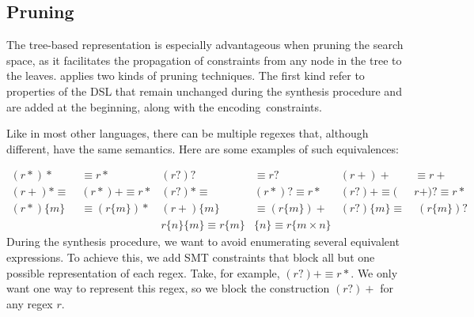 \subsection{Pruning}\label{sec:pruning}
The tree-based representation is especially advantageous when pruning the search space, as it facilitates the propagation of constraints from any node in the tree to the leaves.
\Forest{} applies two kinds of pruning techniques. The first kind refer to properties of the DSL that remain unchanged during the synthesis procedure and are added at the beginning, along with the encoding~constraints. %

Like in most other languages, there can be multiple regexes that, although different, have the same semantics. Here are some examples of such equivalences:
%

%
\begin{align*}
 (r*)* &\equiv r*               &  (r?)? &\equiv r?             &  (r+)+ &\equiv r+ \\
 (r+)* \equiv\;&(r*)+ \equiv r*       &  (r?)* \equiv\;&(r*)? \equiv r*     &  (r?)+ \equiv(&r+)? \equiv r* \\
 (r*)\{m\} &\equiv (r\{m\})*    & (r+)\{m\} &\equiv (r\{m\})+   & (r?)\{m\} \equiv&\; (r\{m\})? \\
                  &&r\{n\}\{m\} \equiv r\{m\}&\{n\} \equiv r\{m\times n\}&&
\end{align*}
\noindent
During the synthesis procedure, we want to avoid enumerating several equivalent expressions. To achieve this, we add \ac{SMT} constraints that block all but one possible representation of each regex. Take, for example, \({(r?)+ \equiv r*}\). We only want one way to represent this regex, so we block the construction \((r?)+\) for any regex \(r\).
